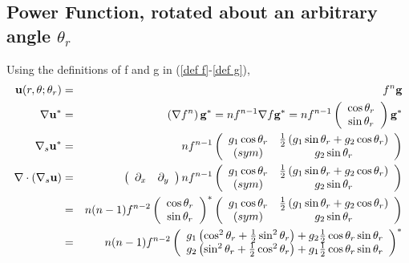 \documentclass[11pt]{report}
\begin{document}
\subsection{Power Function, rotated about an arbitrary angle $\theta_r$\label{power_rotation}}
Using the definitions of f and g in (\ref{def f}-\ref{def g}),
\begin{eqnarray}
{\bf u}(r,\theta;\theta_r) &=& f^n{\bf g}\\
\nabla{\bf u}^* &=& \left( \nabla f^n \right) {\bf g}^* 
=  n f^{n-1} \nabla f {\bf g}^* 
 = n f^{n-1} \left( \begin{array}{c} \cos{\theta_r} \\ \sin{\theta_r} \end{array}    \right)  {\bf g}^* \\
\nabla_s{\bf u}^* &=&  n f^{n-1}
        \left(\begin{array}{cc} g_1\cos{\theta_r} & \frac{1}{2}\left( g_1\sin{\theta_r} + g_2\cos{\theta_r} \right)\\
                        (sym) & g_2\sin{\theta_r}  \end{array} \right)\\
\nabla\cdot\left(\nabla_s{\bf u}\right) &=&  \left( \begin{array}{cc} \partial_x & \partial_y \end{array}   \right)
n f^{n-1} \left(\begin{array}{cc} g_1\cos{\theta_r} & \frac{1}{2}\left( g_1\sin{\theta_r} + g_2\cos{\theta_r} \right)\\
                        (sym) & g_2\sin{\theta_r}  \end{array} \right)\\
 &=& n(n-1) f^{n-2} \left( \begin{array}{c} \cos{\theta_r} \\ \sin{\theta_r} \end{array}    \right)^*  
\left(\begin{array}{cc} g_1\cos{\theta_r} & \frac{1}{2}\left( g_1\sin{\theta_r} + g_2\cos{\theta_r} \right)\\
                        (sym) & g_2\sin{\theta_r}  \end{array} \right)\\
 &=& n(n-1) f^{n-2} \left(\begin{array}{c} 
   g_1\left(\cos^2{\theta_r} + \frac{1}{2}\sin^2{\theta_r}\right) + g_2\frac{1}{2}\cos{\theta_r}\sin{\theta_r} \\
   g_2\left(\sin^2{\theta_r} + \frac{1}{2}\cos^2{\theta_r}\right) + g_1\frac{1}{2}\cos{\theta_r}\sin{\theta_r} \\
\end{array} \right)^*
\end{eqnarray}
\end{document}
